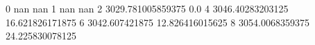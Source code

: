 0 nan nan
1 nan nan
2 3029.781005859375 0.0
4 3046.40283203125 16.621826171875
6 3042.607421875 12.826416015625
8 3054.0068359375 24.225830078125
